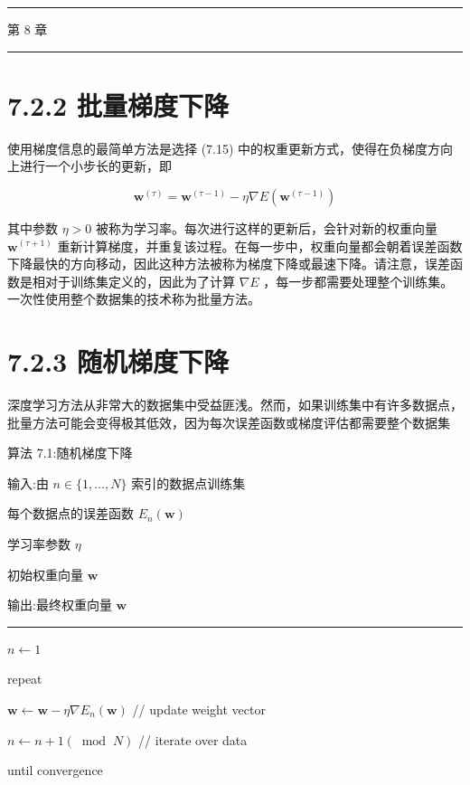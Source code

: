 \documentclass[10pt]{report}
\newcommand{\HRule}{\begin{center}\rule{0.9\linewidth}{0.2mm}\end{center}}
\begin{document}
\HRule

第 8 章

\HRule

\section*{7.2.2 批量梯度下降}

使用梯度信息的最简单方法是选择 (7.15) 中的权重更新方式，使得在负梯度方向上进行一个小步长的更新，即

\[
{\mathbf{w}}^{\left( \tau \right) } = {\mathbf{w}}^{\left( \tau  - 1\right) } - \eta \nabla E\left( {\mathbf{w}}^{\left( \tau  - 1\right) }\right)  \tag{7.16}
\]

其中参数 \(\eta  > 0\) 被称为学习率。每次进行这样的更新后，会针对新的权重向量 \({\mathbf{w}}^{\left( \tau  + 1\right) }\) 重新计算梯度，并重复该过程。在每一步中，权重向量都会朝着误差函数下降最快的方向移动，因此这种方法被称为梯度下降或最速下降。请注意，误差函数是相对于训练集定义的，因此为了计算 \(\nabla E\) ，每一步都需要处理整个训练集。一次性使用整个数据集的技术称为批量方法。

\section*{7.2.3 随机梯度下降}

深度学习方法从非常大的数据集中受益匪浅。然而，如果训练集中有许多数据点，批量方法可能会变得极其低效，因为每次误差函数或梯度评估都需要整个数据集

算法 7.1:随机梯度下降

输入:由 \(n \in  \{ 1,\ldots ,N\}\) 索引的数据点训练集

每个数据点的误差函数 \({E}_{n}\left( \mathbf{w}\right)\)

学习率参数 \(\eta\)

初始权重向量 \(\mathbf{w}\)

输出:最终权重向量 \(\mathbf{w}\)

\HRule

\(n \leftarrow  1\)

repeat

\hspace*{1em} \(\mathbf{w} \leftarrow  \mathbf{w} - \eta \nabla {E}_{n}\left( \mathbf{w}\right)\) // update weight vector

\hspace*{1em} \(n \leftarrow  n + 1\left( {\;\operatorname{mod}\;N}\right)\) // iterate over data

until convergence
\end{document}
